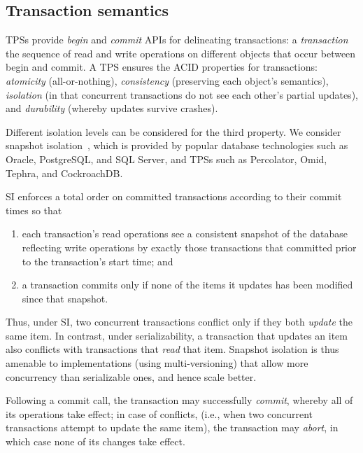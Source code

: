 \subsection{Transaction semantics} \label{ssec:transactions}

TPSs provide \emph{begin} and \emph{commit} APIs for delineating transactions: 
a \emph{transaction} the sequence of read and write operations on different objects 
that occur between begin and commit. A TPS  ensures the ACID properties for transactions:
\emph{atomicity} (all-or-nothing), \emph{consistency} (preserving each object's semantics), 
\emph{isolation} (in that concurrent transactions do not see each other's partial updates), and 
\emph{durability} (whereby updates survive crashes).

Different isolation levels can be considered for the third property. We consider 
snapshot isolation~\cite{DBLP:conf/sigmod/BerensonBGMOO95}, 
which is provided by popular database technologies such as Oracle, PostgreSQL, and SQL Server,
and TPSs such as Percolator, Omid, Tephra, and  CockroachDB.

SI enforces a total order on committed transactions according to their commit times so that 
\begin{enumerate}
    \setlength{\itemsep}{0pt}
    \setlength{\parskip}{0pt}
    \setlength{\parsep}{2pt}  
\item
each transaction's read operations see a consistent snapshot of the database reflecting write operations by
 exactly those transactions that committed prior to the transaction's start time; and 
\item
 a transaction commits only if none of the items it updates has been modified since that snapshot.
 \end{enumerate}
Thus, under SI, two concurrent transactions conflict only if they both \emph{update} the same item.  
In contrast, under serializability, a transaction that updates an item also conflicts with transactions that \emph{read} that item. Snapshot isolation is thus amenable to implementations (using multi-versioning) that 
allow more concurrency than serializable ones, and hence scale better.

Following a commit call, the transaction may successfully \emph{commit}, whereby all of its operations take effect;
in case of conflicts, (i.e., when two concurrent transactions attempt to update the same item), the transaction may
\emph{abort}, in which case none of its changes take effect. 


